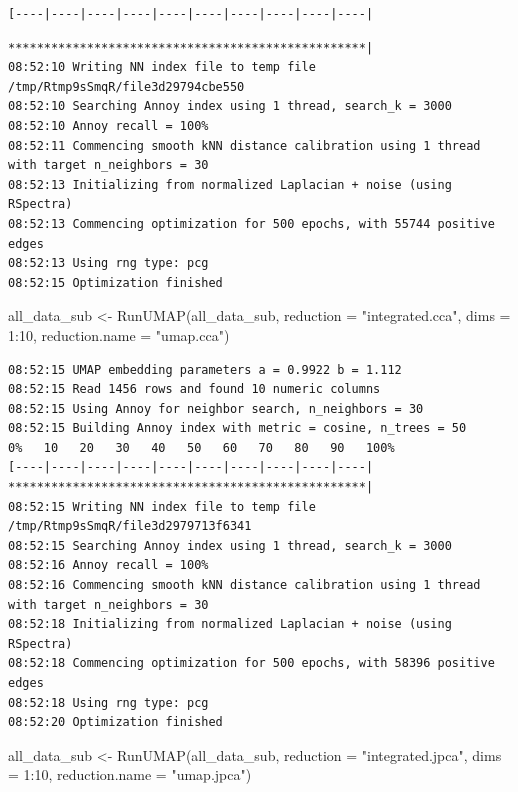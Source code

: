 \documentclass[
  letterpaper,
  DIV=11,
  numbers=noendperiod]{scrreprt}
\newenvironment{Shaded}{\begin{snugshade}}{\end{snugshade}}
\newcommand{\AttributeTok}[1]{\textcolor[rgb]{0.40,0.45,0.13}{#1}}
\newcommand{\DecValTok}[1]{\textcolor[rgb]{0.68,0.00,0.00}{#1}}
\newcommand{\FunctionTok}[1]{\textcolor[rgb]{0.28,0.35,0.67}{#1}}
\newcommand{\NormalTok}[1]{\textcolor[rgb]{0.00,0.23,0.31}{#1}}
\newcommand{\OtherTok}[1]{\textcolor[rgb]{0.00,0.23,0.31}{#1}}
\newcommand{\SpecialCharTok}[1]{\textcolor[rgb]{0.37,0.37,0.37}{#1}}
\newcommand{\StringTok}[1]{\textcolor[rgb]{0.13,0.47,0.30}{#1}}
\begin{document}
\begin{verbatim}
[----|----|----|----|----|----|----|----|----|----|
\end{verbatim}

\begin{verbatim}
**************************************************|
08:52:10 Writing NN index file to temp file /tmp/Rtmp9sSmqR/file3d29794cbe550
08:52:10 Searching Annoy index using 1 thread, search_k = 3000
08:52:10 Annoy recall = 100%
08:52:11 Commencing smooth kNN distance calibration using 1 thread with target n_neighbors = 30
08:52:13 Initializing from normalized Laplacian + noise (using RSpectra)
08:52:13 Commencing optimization for 500 epochs, with 55744 positive edges
08:52:13 Using rng type: pcg
08:52:15 Optimization finished
\end{verbatim}

\begin{Shaded}
\begin{Highlighting}[]
\NormalTok{all\_data\_sub }\OtherTok{\textless{}{-}} \FunctionTok{RunUMAP}\NormalTok{(all\_data\_sub, }\AttributeTok{reduction =} \StringTok{"integrated.cca"}\NormalTok{, }\AttributeTok{dims =} \DecValTok{1}\SpecialCharTok{:}\DecValTok{10}\NormalTok{, }\AttributeTok{reduction.name =} \StringTok{"umap.cca"}\NormalTok{)}
\end{Highlighting}
\end{Shaded}

\begin{verbatim}
08:52:15 UMAP embedding parameters a = 0.9922 b = 1.112
08:52:15 Read 1456 rows and found 10 numeric columns
08:52:15 Using Annoy for neighbor search, n_neighbors = 30
08:52:15 Building Annoy index with metric = cosine, n_trees = 50
0%   10   20   30   40   50   60   70   80   90   100%
[----|----|----|----|----|----|----|----|----|----|
**************************************************|
08:52:15 Writing NN index file to temp file /tmp/Rtmp9sSmqR/file3d2979713f6341
08:52:15 Searching Annoy index using 1 thread, search_k = 3000
08:52:16 Annoy recall = 100%
08:52:16 Commencing smooth kNN distance calibration using 1 thread with target n_neighbors = 30
08:52:18 Initializing from normalized Laplacian + noise (using RSpectra)
08:52:18 Commencing optimization for 500 epochs, with 58396 positive edges
08:52:18 Using rng type: pcg
08:52:20 Optimization finished
\end{verbatim}

\begin{Shaded}
\begin{Highlighting}[]
\NormalTok{all\_data\_sub }\OtherTok{\textless{}{-}} \FunctionTok{RunUMAP}\NormalTok{(all\_data\_sub, }\AttributeTok{reduction =} \StringTok{"integrated.jpca"}\NormalTok{, }\AttributeTok{dims =} \DecValTok{1}\SpecialCharTok{:}\DecValTok{10}\NormalTok{, }\AttributeTok{reduction.name =} \StringTok{"umap.jpca"}\NormalTok{)}
\end{Highlighting}
\end{Shaded}
\end{document}
